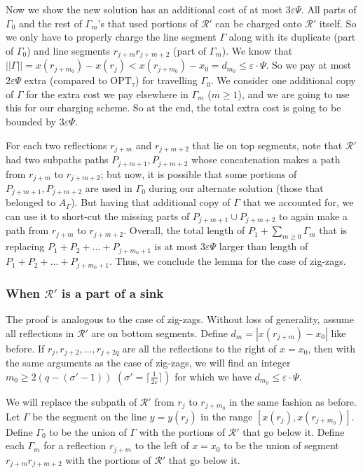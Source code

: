 \documentclass[10pt,a4paper]{amsart}
\theoremstyle{thmstyleone}
\newcommand{\eps}{\varepsilon}
\newcommand{\OPT}{{\text{OPT}}}
\newcommand{\norm}[1]{|| #1 ||}
\newcommand{\abs}[1]{\left.|#1|\right.}
\begin{document}
        Now we show the new solution has an additional cost of at most $3\eps\Psi$. All parts of $\Gamma_0$ and the rest of $\Gamma_m$'s that used portions of $\mathcal R'$ can be charged onto $\mathcal R'$ itself. So we only have to properly charge the line segment $\Gamma$ along with its duplicate (part of $\Gamma_0$) and line segments $r_{j + m}r_{j + m + 2}$ (part of $\Gamma_m$). We know that $\norm \Gamma = x(r_{j + m_0}) - x(r_{j}) < x(r_{j + m_0}) - x_0 = d_{m_0} \le \eps\cdot\Psi$. So we pay at most $2\eps\Psi$ extra (compared to $\OPT_\tau$) for travelling $\Gamma_0$. We consider one additional copy of $\Gamma$ for the extra cost we pay elsewhere in $\Gamma_m$ ($m\geq 1$), and we are going to use this for our charging scheme. So at the end, the total extra cost is going to be bounded by $3\eps\Psi$.
        
        For each two reflections $r_{j + m}$ and $r_{j + m + 2}$ that lie on top segments, note that $\mathcal R'$ had
        two subpaths paths $P_{j+m + 1},P_{j+m + 2}$ whose concatenation makes a path from $r_{j+m}$ to $r_{j+m+2}$; but now, it is possible that some portions of $P_{j+m+1},P_{j+m + 2}$ are used in $\Gamma_0$ during our alternate solution (those that belonged to $A_\Gamma$). But having that additional copy of $\Gamma$ that we accounted for, we can use it to short-cut the missing parts of $P_{j+m + 1}\cup P_{j+m + 2}$ to again make a path from $r_{j + m}$ to $r_{j + m + 2}$. Overall, the total length of $P_1+\sum_{m\geq 0} \Gamma_m$ that is replacing $P_1+P_2+\ldots+P_{j+m_0+1}$ is at most $3\eps\Psi$ larger than length of $P_1+P_2+\ldots+P_{j+m_0+1}$.
        Thus, we conclude the lemma for the case of zig-zags.
        

\subsubsection*{When $\mathcal R'$ is a part of a sink}
    The proof is analogous to the case of zig-zags. Without loss of generality, assume all reflections in $\mathcal R'$ are on bottom segments. Define $d_{m} = \abs{x(r_{j + m}) - x_0}$ like before. If $r_{j}, r_{j+2},\dots, r_{j + 2q}$ are all the reflections to the right of $ x = x_0 $, then with the same arguments as the case of zig-zags, we will find an integer $m_0 \ge 2(q - (\sigma' -1))$ $(\sigma' = \lceil \frac{1}{2\eps}\rceil)$ for which we have $d_{m_0} \le \eps\cdot\Psi$. 
    
    We will replace the subpath of $\mathcal R'$ from $r_j$ to $r_{j + m_0}$ in the same fashion as before. Let $\Gamma$ be the segment on the line $y = y(r_j)$ in the range $[x(r_j),\left. x(r_{j + m_0}) \right.]$. Define $\Gamma_0$ to be the union of $\Gamma$ with the portions of $\mathcal R'$ that go below it. Define each $\Gamma_m$ for a reflection $r_{j + m}$ to the left of $x = x_0$ to be the union of segment $r_{j+m}\left. r_{j + m + 2}\right.$ with the portions of $\mathcal R'$ that go below it.
\end{document}
